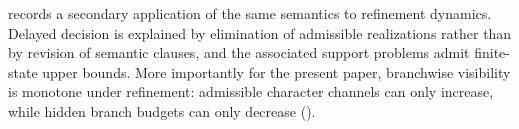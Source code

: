  records a secondary application of the same semantics to refinement dynamics. Delayed decision is explained by elimination of admissible realizations rather than by revision of semantic clauses, and the associated support problems admit finite-state upper bounds. More importantly for the present paper, branchwise visibility is monotone under refinement: admissible character channels can only increase, while hidden branch budgets can only decrease ().
